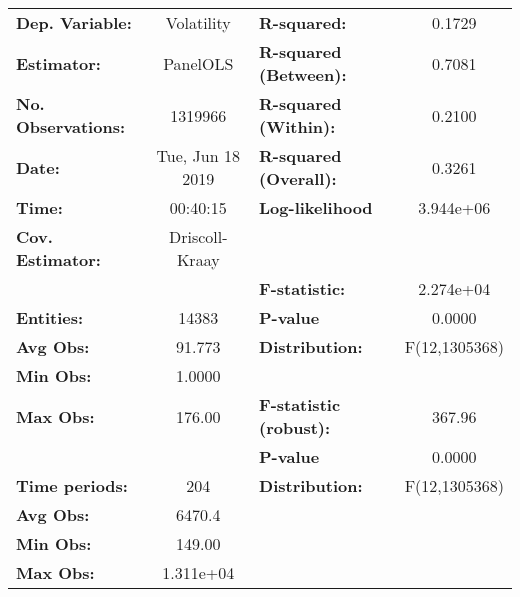 \begin{center}
\begin{tabular}{lclc}
\toprule
\textbf{Dep. Variable:}                 &     Volatility     & \textbf{  R-squared:         }   &      0.1729      \\
\textbf{Estimator:}                     &      PanelOLS      & \textbf{  R-squared (Between):}  &      0.7081      \\
\textbf{No. Observations:}              &      1319966       & \textbf{  R-squared (Within):}   &      0.2100      \\
\textbf{Date:}                          &  Tue, Jun 18 2019  & \textbf{  R-squared (Overall):}  &      0.3261      \\
\textbf{Time:}                          &      00:40:15      & \textbf{  Log-likelihood     }   &    3.944e+06     \\
\textbf{Cov. Estimator:}                &   Driscoll-Kraay   & \textbf{                     }   &                  \\
\textbf{}                               &                    & \textbf{  F-statistic:       }   &    2.274e+04     \\
\textbf{Entities:}                      &       14383        & \textbf{  P-value            }   &      0.0000      \\
\textbf{Avg Obs:}                       &       91.773       & \textbf{  Distribution:      }   &  F(12,1305368)   \\
\textbf{Min Obs:}                       &       1.0000       & \textbf{                     }   &                  \\
\textbf{Max Obs:}                       &       176.00       & \textbf{  F-statistic (robust):} &      367.96      \\
\textbf{}                               &                    & \textbf{  P-value            }   &      0.0000      \\
\textbf{Time periods:}                  &        204         & \textbf{  Distribution:      }   &  F(12,1305368)   \\
\textbf{Avg Obs:}                       &       6470.4       & \textbf{                     }   &                  \\
\textbf{Min Obs:}                       &       149.00       & \textbf{                     }   &                  \\
\textbf{Max Obs:}                       &     1.311e+04      & \textbf{                     }   &                  \\

\end{tabular}
\end{center}
